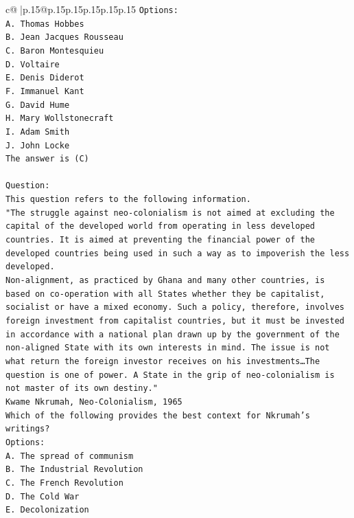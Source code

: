 \documentclass{article}
\begin{document}
{\begin{supertabular}{c@{$\;$}|p{.15\linewidth}@{}p{.15\linewidth}p{.15\linewidth}p{.15\linewidth}p{.15\linewidth}p{.15\linewidth}}
{{{\texttt{Options:} \\
\texttt{A. Thomas Hobbes} \\
\texttt{B. Jean Jacques Rousseau} \\
\texttt{C. Baron Montesquieu} \\
\texttt{D. Voltaire} \\
\texttt{E. Denis Diderot} \\
\texttt{F. Immanuel Kant} \\
\texttt{G. David Hume} \\
\texttt{H. Mary Wollstonecraft} \\
\texttt{I. Adam Smith} \\
\texttt{J. John Locke} \\
\texttt{The answer is (C)} \\
\\ 
\texttt{Question:} \\
\texttt{This question refers to the following information.} \\
\texttt{"The struggle against neo{-}colonialism is not aimed at excluding the capital of the developed world from operating in less developed countries. It is aimed at preventing the financial power of the developed countries being used in such a way as to impoverish the less developed.} \\
\texttt{Non{-}alignment, as practiced by Ghana and many other countries, is based on co{-}operation with all States whether they be capitalist, socialist or have a mixed economy. Such a policy, therefore, involves foreign investment from capitalist countries, but it must be invested in accordance with a national plan drawn up by the government of the non{-}aligned State with its own interests in mind. The issue is not what return the foreign investor receives on his investments…The question is one of power. A State in the grip of neo{-}colonialism is not master of its own destiny."} \\
\texttt{Kwame Nkrumah, Neo{-}Colonialism, 1965} \\
\texttt{Which of the following provides the best context for Nkrumah's writings?} \\
\texttt{Options:} \\
\texttt{A. The spread of communism} \\
\texttt{B. The Industrial Revolution} \\
\texttt{C. The French Revolution} \\
\texttt{D. The Cold War} \\
\texttt{E. Decolonization} \\
}}}
\end{supertabular}}
\end{document}
